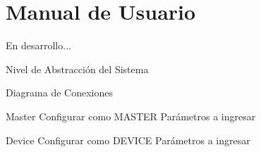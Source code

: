 
\chapter{Manual de Usuario} %

\label{AppendixA} %
En desarrollo...

Nivel de Abstracción del Sistema

Diagrama de Conexiones

Master
Configurar como MASTER
Parámetros a ingresar


Device
Configurar como DEVICE
Parámetros a ingresar





